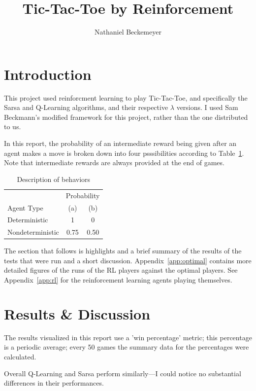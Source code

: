 \documentclass{journal}
\title{Tic-Tac-Toe by Reinforcement}
\author{Nathaniel Beckemeyer}
\begin{document}
\maketitle{}

\section{Introduction}
This project used reinforcment learning to play Tic-Tac-Toe, and specifically
the Sarsa and Q-Learning algorithms, and their respective $\lambda{}$ versions.
I used Sam Beckmann's modified framework for this project, rather than the
one distributed to us.

In this report, the probability of an intermediate reward being given after an
agent makes a move is broken down into four psssibilities according to
Table~\ref{tab:breakdown}. Note that intermediate rewards are always provided
at the end of games.

\begin{table}[h]
\centering{}
\begin{tabular}{lcc}
    & \multicolumn{2}{c}{Probability} \\ \cline{2-3}
    Agent Type & (a) & (b) \\ \toprule
    Deterministic & 1 & 0 \\
    Nondeterministic & 0.75 & 0.50 \\
\end{tabular}
\caption{Description of behaviors}\label{tab:breakdown}
\end{table}

The section that follows is highlights and a brief summary of the results of the
tests that were run and a short discussion. Appendix~\ref{app:optimal} contains
more detailed figures of the runs of the RL players against the optimal players.
See Appendix~\ref{app:rl} for the reinforcement learning agents playing
themselves.

\section{Results \& Discussion}
The results visualized in this report use a 'win percentage' metric; this
percentage is a periodic average; every 50 games the summary data for the
percentages were calculated.

Overall Q-Learning and Sarsa perform similarly---I could notice no substantial
differences in their performances.
\end{document}
